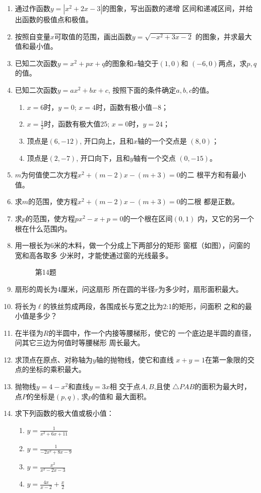 \begin{enumerate}
\item 通过作函数$y=|x^2+2x-3|$的图象，写出函数的递增
区间和递减区间，并给出函数的极值点和极值。
\item 按照自变量$x$可取值的范围，画出函数$y=\sqrt{-x^2+3x-2}$
的图象，并求最大值和最小值。
\item 已知二次函数$y=x^2+px+q$的图象和$x$轴交于$(1,0)$和
$(-6,0)$两点，求$p,q$的值。
\item 已知二次函数$y=ax^2+bx+c$, 按照下面的条件确定$a,
b,c$的值。
\begin{enumerate}
\item $x=6$时，$y=0$; $x=4$时，函数有极小值$-8$；
\item $x=\frac{1}{2}$时，函数有极大值25; $x=0$时，$y=24$；
\item 顶点是$(6,-12)$, 开口向上，且和$x$轴的一个交点是
$(8,0)$；
\item 顶点是$(2,-7)$, 开口向下，且和$y$轴有一个交点
$(0,-15)$。
\end{enumerate}

\item  $m$为何值使二次方程$x^2+(m-2)x-(m+3)=0$的二
根平方和有最小值。
\item 求$m$的范围，使方程$x^2+(m-2)x-(m+3)=0$的二根
都是正数。
\item  求$p$的范围，使方程$px^2-x+p=0$的一个根在区间$(0,1)$
内，又它的另一个根在什么范围内。
\item 用一根长为6米的木料，做一个分成上下两部分的矩形
窗框（如图），问窗的宽和高各取多
少米时，才能使通过窗的光线最多。
\begin{figure}[htp]
    \centering
    \caption{第14题}
\end{figure}

\item 扇形的周长为4厘米，问这扇形
所在圆的半径$r$为多少时，扇形面积最大。
\item 将长为$\ell$的铁丝剪成两段，各围成长与宽之比为2:1的矩形，问面积
之和的最小值是多少？
\item 在半径为$R$的半圆中，作一个内接等腰梯形，使它的
一个底边是半圆的直径，问其它三边为何值时等腰梯形
周长最大。
\item 求顶点在原点、对称轴为$y$轴的抛物线，使它和直线
$x+y=1$在第一象限的交点的坐标的乘积最大。
\item 抛物线$y=4-x^2$和直线$y=3x$相 交于点$A,B$,且使
$\triangle PAB$的面积为最大时，点$P$的坐标是$(p,q)$, 求$p$的值和
最大面积。
\item 求下列函数的极大值或极小值：
\begin{multicols}{2}
\begin{enumerate}
    \item $y=\frac{1}{x^2+6x+11}$
    \item $y=\frac{1}{-2x^2+8x-9}$
    \item $y=\frac{x^2}{x^2-2x-3}$
    \item $y=\frac{4x}{x-2}+\frac{x}{2}$
\end{enumerate}
\end{multicols}


\end{enumerate}
